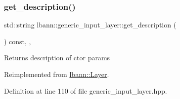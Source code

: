 \subsubsection{\texorpdfstring{get\+\_\+description()}{get\_description()}}
{\footnotesize\ttfamily std\+::string lbann\+::generic\+\_\+input\+\_\+layer\+::get\+\_\+description (\begin{DoxyParamCaption}{ }\end{DoxyParamCaption}) const\hspace{0.3cm}{\ttfamily [inline]}, {\ttfamily [override]}, {\ttfamily [virtual]}}

Returns description of ctor params 

Reimplemented from \hyperlink{classlbann_1_1Layer_acc0803d3428914ca1eb5988c4309174a}{lbann\+::\+Layer}.



Definition at line 110 of file generic\+\_\+input\+\_\+layer.\+hpp.


